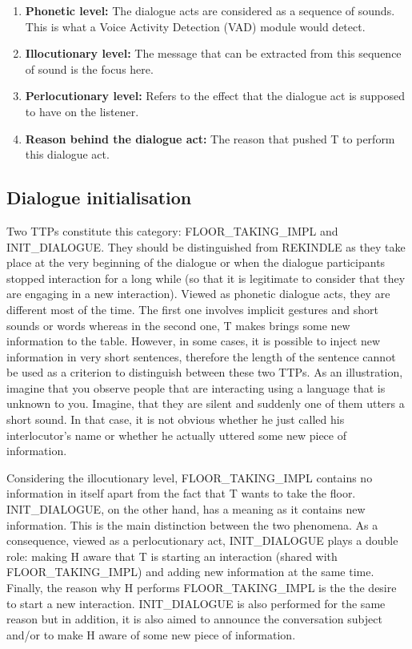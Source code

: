 		\begin{enumerate}
			\item \textbf{Phonetic level:} The dialogue acts are considered as a sequence of sounds. This is what a Voice Activity Detection (VAD) module would detect.
			\item \textbf{Illocutionary level:} The message that can be extracted from this sequence of sound is the focus here.
			\item \textbf{Perlocutionary level:} Refers to the effect that the dialogue act is supposed to have on the listener.
			\item \textbf{Reason behind the dialogue act:} The reason that pushed T to perform this dialogue act.
		\end{enumerate}

    \subsection{Dialogue initialisation}
    \label{tax:dialinit}
		
         Two TTPs constitute this category: FLOOR\_TAKING\_IMPL and INIT\_DIALOGUE. They should be distinguished from REKINDLE as they take place at the very beginning of the dialogue or when the dialogue participants stopped interaction for a long while (so that it is legitimate to consider that they are engaging in a new interaction). Viewed as phonetic dialogue acts, they are different most of the time. The first one involves implicit gestures and short sounds or words whereas in the second one, T makes brings some new information to the table. However, in some cases, it is possible to inject new information in very short sentences, therefore the length of the sentence cannot be used as a criterion to distinguish between these two TTPs. As an illustration, imagine that you observe people that are interacting using a language that is unknown to you. Imagine, that they are silent and suddenly one of them utters a short sound. In that case, it is not obvious whether he just called his interlocutor's name or whether he actually uttered some new piece of information.
			
	 Considering the illocutionary level, FLOOR\_TAKING\_IMPL contains no information in itself apart from the fact that T wants to take the floor. INIT\_DIALOGUE, on the other hand, has a meaning as it contains new information. This is the main distinction between the two phenomena. As a consequence, viewed as a perlocutionary act, INIT\_DIALOGUE plays a double role: making H aware that T is starting an interaction (shared with FLOOR\_TAKING\_IMPL) and adding new information at the same time. Finally, the reason why H performs FLOOR\_TAKING\_IMPL is the the desire to start a new interaction. INIT\_DIALOGUE is also performed for the same reason but in addition, it is also aimed to announce the conversation subject and/or to make H aware of some new piece of information.

